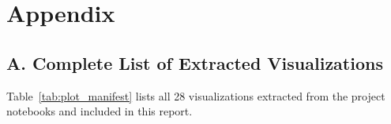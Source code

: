 \documentclass[12pt, a4paper]{article}
\begin{document}
\newpage
\appendix
\section*{Appendix}

\subsection*{A. Complete List of Extracted Visualizations}

Table~\ref{tab:plot_manifest} lists all 28 visualizations extracted from the project notebooks and included in this report.
\end{document}
